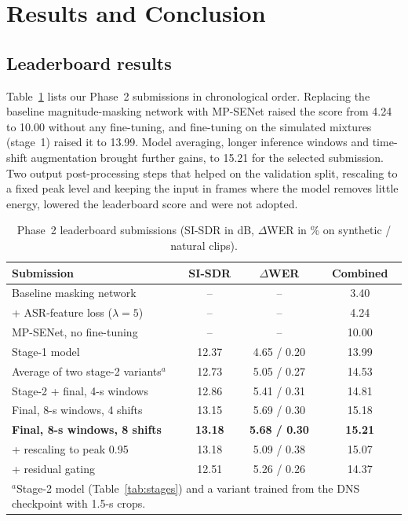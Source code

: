 \documentclass[conference]{IEEEtran}
\begin{document}
\section{Results and Conclusion}\label{sec:results}
\subsection{Leaderboard results}
Table~\ref{tab:lb} lists our Phase~2 submissions in chronological order. Replacing the baseline magnitude-masking network with MP-SENet raised the score from 4.24 to 10.00 without any fine-tuning, and fine-tuning on the simulated mixtures (stage~1) raised it to 13.99. Model averaging, longer inference windows and time-shift augmentation brought further gains, to 15.21 for the selected submission. Two output post-processing steps that helped on the validation split, rescaling to a fixed peak level and keeping the input in frames where the model removes little energy, lowered the leaderboard score and were not adopted.

\begin{table}[t]\centering\caption{Phase~2 leaderboard submissions (SI-SDR in dB, $\Delta$WER in \% on synthetic / natural clips).}\label{tab:lb}\footnotesize\setlength{\tabcolsep}{2.5pt}
\begin{tabular}{lccc}\toprule
Submission & SI-SDR & $\Delta$WER & Combined\\\midrule
Baseline masking network & -- & -- & 3.40\\
\quad + ASR-feature loss ($\lambda{=}5$) & -- & -- & 4.24\\
MP-SENet, no fine-tuning & -- & -- & 10.00\\
Stage-1 model & 12.37 & 4.65 / 0.20 & 13.99\\
Average of two stage-2 variants$^{a}$ & 12.73 & 5.05 / 0.27 & 14.53\\
Stage-2 + final, 4-s windows & 12.86 & 5.41 / 0.31 & 14.81\\
Final, 8-s windows, 4 shifts & 13.15 & 5.69 / 0.30 & 15.18\\
\textbf{Final, 8-s windows, 8 shifts} & \textbf{13.18} & \textbf{5.68 / 0.30} & \textbf{15.21}\\
\quad + rescaling to peak 0.95 & 13.18 & 5.09 / 0.38 & 15.07\\
\quad + residual gating & 12.51 & 5.26 / 0.26 & 14.37\\\bottomrule
\multicolumn{4}{p{0.95\columnwidth}}{\scriptsize $^{a}$Stage-2 model (Table~\ref{tab:stages}) and a variant trained from the DNS checkpoint with 1.5-s crops.}
\end{tabular}\end{table}
\end{document}
